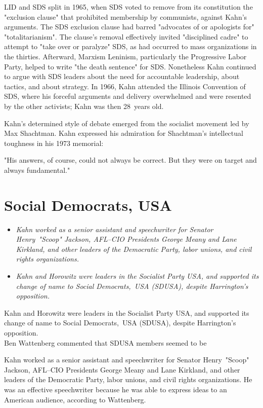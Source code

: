 LID and SDS split in 1965, when SDS voted to remove from its
constitution the "exclusion clause" that prohibited membership by
communists, against Kahn's arguments. The SDS exclusion clause had
barred "advocates of or apologists for" "totalitarianism". The clause's
removal effectively invited "disciplined cadre" to attempt to "take over
or paralyze" SDS, as had occurred to mass organizations in the thirties.
Afterward, Marxism Leninism, particularly the Progressive Labor Party,
helped to write "the death sentence" for SDS. Nonetheless Kahn continued
to argue with SDS leaders about the need for accountable leadership,
about tactics, and about strategy. In 1966, Kahn attended the Illinois
Convention of SDS, where his forceful arguments and delivery overwhelmed
and were resented by the other activists; Kahn was then 28~years old.

Kahn's determined style of debate emerged from the socialist movement
led by Max Shachtman. Kahn expressed his admiration for Shachtman's
intellectual toughness in his 1973 memorial:

"His answers, of course, could not always be correct. But they were on
target and always fundamental."

\section{Social Democrats, USA}\label{social-democrats-usa}

\begin{itemize}
\item
  \emph{Kahn worked as a senior assistant and speechwriter for Senator
  Henry~"Scoop" Jackson, AFL--CIO Presidents George Meany and Lane
  Kirkland, and other leaders of the Democratic Party, labor unions, and
  civil rights organizations.}
\item
  \emph{Kahn and Horowitz were leaders in the Socialist Party USA, and
  supported its change of name to Social Democrats,~USA (SDUSA), despite
  Harrington's opposition.}
\end{itemize}

Kahn and Horowitz were leaders in the Socialist Party USA, and supported
its change of name to Social Democrats,~USA (SDUSA), despite
Harrington's opposition.\\
Ben Wattenberg commented that SDUSA members seemed to be

Kahn worked as a senior assistant and speechwriter for Senator
Henry~"Scoop" Jackson, AFL--CIO Presidents George Meany and Lane
Kirkland, and other leaders of the Democratic Party, labor unions, and
civil rights organizations. He was an effective speechwriter because he
was able to express ideas to an American audience, according to
Wattenberg.

